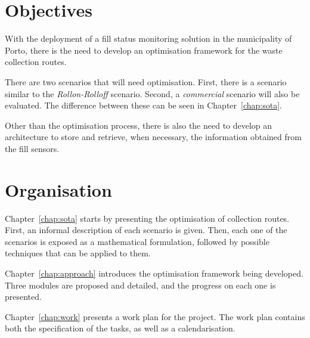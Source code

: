 \section{Objectives}
\label{section:objectives}

With the deployment of a fill status monitoring solution in the municipality
of Porto, there is the need to develop an optimisation framework for the
waste collection routes.

There are two scenarios that will need optimisation. First, there is a
scenario similar to the \textit{Rollon-Rolloff} scenario. Second, a
\textit{commercial} scenario will also be evaluated. The difference between
these can be seen in Chapter~\ref{chap:sota}.

Other than the optimisation process, there is also the need to develop an
architecture to store and retrieve, when necessary, the information obtained
from the fill sensors.


\section{Organisation}

Chapter~\ref{chap:sota} starts by presenting the optimisation of collection routes.
First, an informal description of each scenario is given. Then, each one of the
scenarios is exposed as a mathematical formulation, followed by possible
techniques that can be applied to them.

Chapter~\ref{chap:approach} introduces the optimisation framework being
developed. Three modules are proposed and detailed, and the progress on each
one is presented.

Chapter~\ref{chap:work} presents a work plan for the project.  The work plan
contains both the specification of the tasks, as well as a calendarisation.

